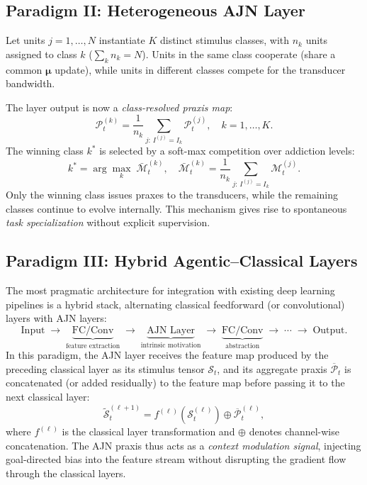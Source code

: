 \documentclass[12pt,a4paper]{article}
\begin{document}
\subsection{Paradigm II: Heterogeneous AJN Layer}

Let units $j = 1, \ldots, N$ instantiate $K$ distinct stimulus classes, with
$n_k$ units assigned to class $k$ ($\sum_k n_k = N$). Units in the same class
cooperate (share a common $\boldsymbol{\mu}$ update), while units in different
classes compete for the transducer bandwidth.

The layer output is now a \textit{class-resolved praxis map}:
\begin{equation}
\mathcal{P}_t^{(k)} = \frac{1}{n_k}\sum_{j:\, I^{(j)} = I_k} \mathcal{P}_t^{(j)},
\quad k = 1, \ldots, K.
\label{eq:hetero_praxis}
\end{equation}
The winning class $k^*$ is selected by a soft-max competition over addiction levels:
\begin{equation}
k^* = \arg\max_k \; \bar{\mathcal{M}}_t^{(k)}, \quad
\bar{\mathcal{M}}_t^{(k)} = \frac{1}{n_k}\sum_{j:\, I^{(j)} = I_k} \mathcal{M}_t^{(j)}.
\label{eq:winner_class}
\end{equation}
Only the winning class issues praxes to the transducers, while the remaining
classes continue to evolve internally. This mechanism gives rise to spontaneous
\textit{task specialization} without explicit supervision.

\subsection{Paradigm III: Hybrid Agentic--Classical Layers}

The most pragmatic architecture for integration with existing deep learning
pipelines is a hybrid stack, alternating classical feedforward (or convolutional)
layers with AJN layers:
\[
\text{Input}
\;\to\; \underbrace{\text{FC/Conv}}_{\text{feature extraction}}
\;\to\; \underbrace{\text{AJN Layer}}_{\text{intrinsic motivation}}
\;\to\; \underbrace{\text{FC/Conv}}_{\text{abstraction}}
\;\to\; \cdots
\;\to\; \text{Output}.
\]
In this paradigm, the AJN layer receives the feature map produced by the
preceding classical layer as its stimulus tensor $\mathcal{S}_t$, and its
aggregate praxis $\overline{\mathcal{P}}_t$ is concatenated (or added residually)
to the feature map before passing it to the next classical layer:
\begin{equation}
\tilde{\mathcal{S}}_t^{(\ell+1)} = f^{(\ell)}\!\left(\mathcal{S}_t^{(\ell)}\right)
\oplus \overline{\mathcal{P}}_t^{(\ell)},
\label{eq:hybrid}
\end{equation}
where $f^{(\ell)}$ is the classical layer transformation and $\oplus$ denotes
channel-wise concatenation. The AJN praxis thus acts as a \textit{context
modulation signal}, injecting goal-directed bias into the feature stream without
disrupting the gradient flow through the classical layers.
\end{document}
